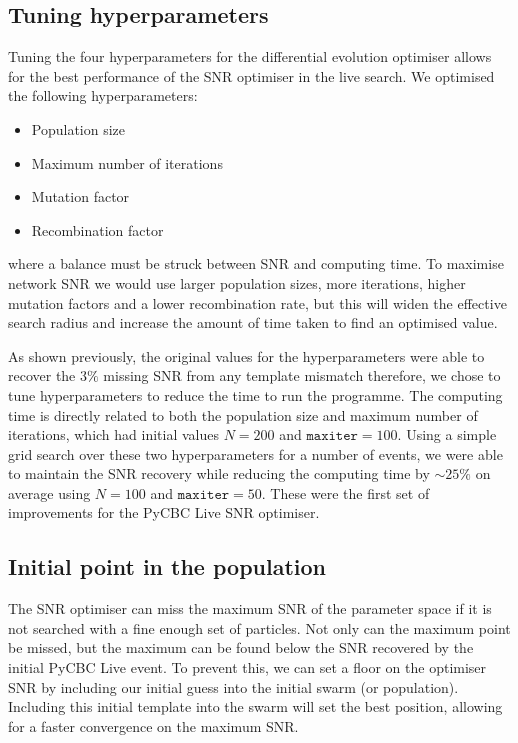 \subsection{\label{7:sec:de_hyperparameter_tuning}Tuning hyperparameters}

Tuning the four hyperparameters for the differential evolution optimiser allows for the best performance of the SNR optimiser in the live search. We optimised the following hyperparameters:
%
\begin{itemize}
    \item Population size
    \item Maximum number of iterations
    \item Mutation factor
    \item Recombination factor
\end{itemize}
%
where a balance must be struck between SNR and computing time. To maximise network SNR we would use larger population sizes, more iterations, higher mutation factors and a lower recombination rate, but this will widen the effective search radius and increase the amount of time taken to find an optimised value.

As shown previously, the original values for the hyperparameters were able to recover the $3\%$ missing SNR from any template mismatch therefore, we chose to tune hyperparameters to reduce the time to run the programme. The computing time is directly related to both the population size and maximum number of iterations, which had initial values $N = 200$ and $\texttt{maxiter} = 100$. Using a simple grid search over these two hyperparameters for a number of events, we were able to maintain the SNR recovery while reducing the computing time by ${\sim}25\%$ on average using $N = 100$ and $\texttt{maxiter} = 50$. These were the first set of improvements for the PyCBC Live SNR optimiser.

\subsection{Initial point in the population}

The SNR optimiser can miss the maximum SNR of the parameter space if it is not searched with a fine enough set of particles. Not only can the maximum point be missed, but the maximum can be found below the SNR recovered by the initial PyCBC Live event. To prevent this, we can set a floor on the optimiser SNR by including our initial guess into the initial swarm (or population). Including this initial template into the swarm will set the best position, allowing for a faster convergence on the maximum SNR.

